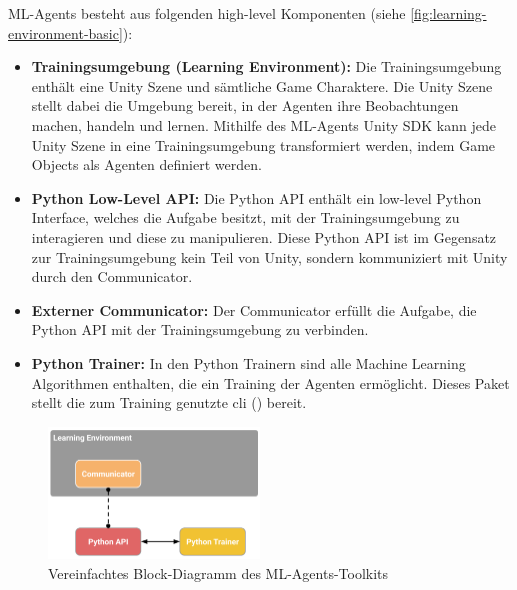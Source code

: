 ML-Agents besteht aus folgenden high-level Komponenten \cite{mlagentsOverview} (siehe \autoref{fig:learning-environment-basic}):
\begin{itemize}
    \item \textbf{Trainingsumgebung (Learning Environment):}
    Die Trainingsumgebung enthält eine Unity Szene und sämtliche Game Charaktere.
    Die Unity Szene stellt dabei die Umgebung bereit, in der Agenten ihre Beobachtungen machen, handeln und lernen.
    Mithilfe des ML-Agents Unity SDK kann jede Unity Szene in eine Trainingsumgebung transformiert werden, indem Game Objects als Agenten definiert werden.

    \item \textbf{Python Low-Level API:}
    Die Python API enthält ein low-level Python Interface, welches die Aufgabe besitzt, mit der Trainingsumgebung zu interagieren und diese zu manipulieren.
    Diese Python API ist im Gegensatz zur Trainingsumgebung kein Teil von Unity, sondern kommuniziert mit Unity durch den Communicator.

    \item \textbf{Externer Communicator:}
    Der Communicator erfüllt die Aufgabe, die Python API mit der Trainingsumgebung zu verbinden.

    \item \textbf{Python Trainer:}
    In den Python Trainern sind alle Machine Learning Algorithmen enthalten, die ein Training der Agenten ermöglicht.
    Dieses Paket stellt die zum Training genutzte \ac{cli} () bereit.
\end{itemize}

\begin{figure}
    \centering
    \includegraphics[width = 0.5\textwidth]{Bilder/ml-agents/learning_environment_basic.png}
    \caption{Vereinfachtes Block-Diagramm des ML-Agents-Toolkits \cite{mlagentsOverview}}
    \label{fig:learning-environment-basic}
\end{figure}

